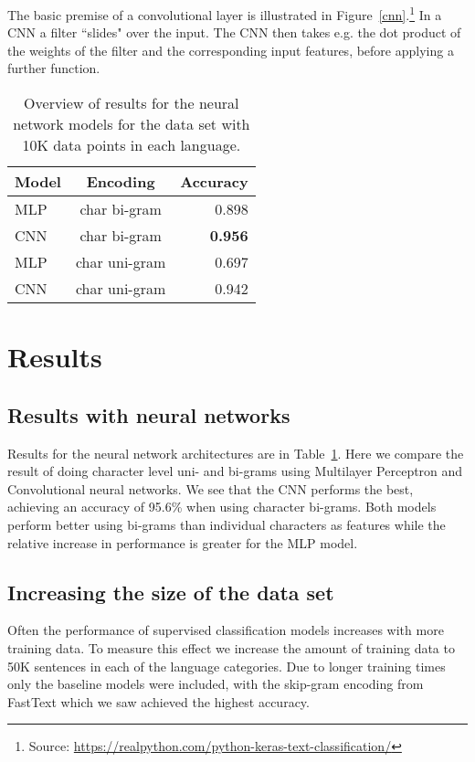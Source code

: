 \documentclass[11pt,a4paper]{article}
\begin{document}
The basic premise of a convolutional layer is illustrated in Figure~\ref{cnn}.\footnote{Source: \url{https://realpython.com/python-keras-text-classification/}} In a CNN a filter ``slides" over the input. The CNN then takes e.g. the dot product of the weights of the filter and the corresponding input features, before applying a further function.
 
\begin{table}
  \centering
  \begin{tabular}{ l | c | r }
    \hline
    Model               & Encoding  & Accuracy \\
    \hline
    MLP                 & char bi-gram &  0.898 \\
    CNN                 & char bi-gram & \textbf{0.956} \\
MLP                 & char uni-gram &  0.697\\
    CNN                 & char uni-gram  & 0.942 \\
\hline
  \end{tabular}
  \caption{Overview of results for the neural network models for the data set with 10K data points in each language.}
  \label{keras-results}
\end{table}

\section{Results}

\subsection{Results with neural networks}
Results for the neural network architectures are in Table~\ref{keras-results}. Here we compare the result of doing character level uni- and bi-grams using Multilayer Perceptron and Convolutional neural networks. We see that the CNN performs the best, achieving an accuracy of 95.6\% when using character bi-grams. Both models perform better using bi-grams than individual characters as features while the relative increase in performance is greater for the MLP model.


\subsection{Increasing the size of the data set}
Often the performance of supervised classification models increases with more training data. To measure this effect we increase the amount of training data to 50K sentences in each of the language categories. Due to longer training times only the baseline models were included, with the skip-gram encoding from FastText which we saw achieved the highest accuracy.
\end{document}
